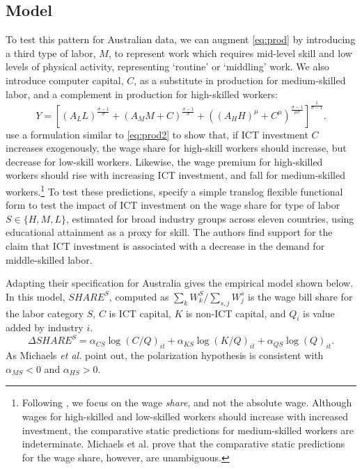 \subsection{Model}

To test this pattern for Australian data, we can augment \eqref{eq:prod} by introducing a third type of labor, $M$, to represent work which requires mid-level skill and low levels of physical activity, representing `routine' or `middling' work. We also introduce computer capital, $C$, as a substitute in production for medium-skilled labor, and a complement in production for high-skilled workers:
\begin{equation}  \label{eq:prod2}
Y = \left[
  \left(A_LL \right)^\frac{\sigma-1}{\sigma}
  +
  \left(A_MM + C\right)^\frac{\sigma-1}{\sigma}
  +
  \left((A_HH)^\mu + C^\mu\right)^\frac{\sigma-1}{\mu\sigma}
  \right]^\frac{1}{\sigma-1}.
\end{equation}
\citet{Michaels2010} use a formulation similar to \eqref{eq:prod2} to show that, if ICT investment $C$ increases exogenously, the wage share for high-skill workers should increase, but decrease for low-skill workers. Likewise, the wage premium for high-skilled workers should rise with increasing ICT investment, and fall for medium-skilled workers.\footnote{Following \citet{Michaels2010}, we focus on the wage {\em share}, and not the absolute wage. Although wages for high-skilled and low-skilled workers should increase with increased investment, the comparative static predictions for medium-skilled workers are indeterminate. Michaels et al. prove that the comparative static predictions for the wage share, however, are unambiguous.} To test these predictions, \citet{Michaels2010} specify a simple translog flexible functional form to test the impact of ICT investment on the wage share for type of labor $S\in\{H,M,L\}$, estimated for broad industry groups across eleven countries, using educational attainment as a proxy for skill. The authors find support for the claim that ICT investment is associated with a decrease in the demand for middle-skilled labor. 

Adapting their specification for Australia gives the empirical model shown below. In this model, $SHARE^S$, computed as ${\sum_k W^S_k/\sum_{s,j}W^s_j}$ is the wage bill share for the labor category $S$, $C$ is ICT capital, $K$ is non-ICT capital, and $Q_i$ is value added by industry $i$. 
\begin{equation} \label{eq:translog}
\Delta SHARE^S = \alpha_{CS}\log(C/Q)_{it} + \alpha_{KS}\log(K/Q)_{it} + \alpha_{QS}\log(Q)_{it}.
\end{equation}
As Michaels {\it et al.} point out, the polarization hypothesis is consistent with $\alpha_{MS}<0$ and $\alpha_{HS}>0$.


